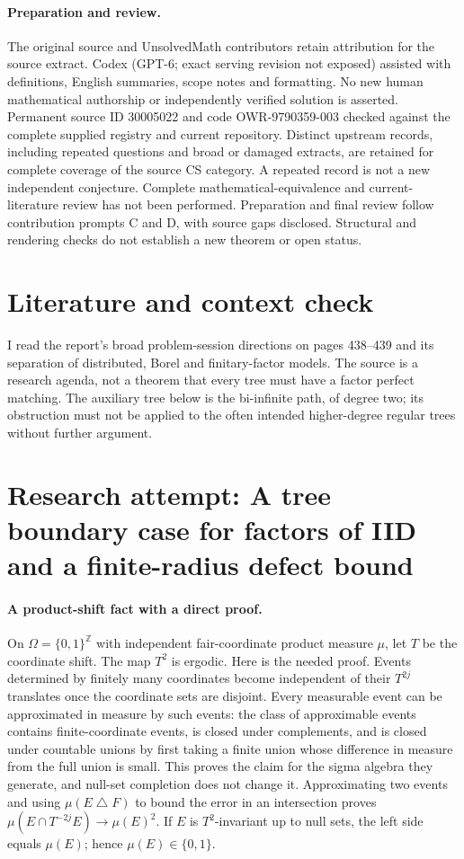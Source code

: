\documentclass[11pt]{article}
\begin{document}
\paragraph{Preparation and review.}
The original source and UnsolvedMath contributors retain attribution for the source extract. Codex (GPT-6; exact serving revision not exposed) assisted with definitions, English summaries, scope notes and formatting. No new human mathematical authorship or independently verified solution is asserted. Permanent source ID 30005022 and code OWR-9790359-003 checked against the complete supplied registry and current repository. Distinct upstream records, including repeated questions and broad or damaged extracts, are retained for complete coverage of the source CS category. A repeated record is not a new independent conjecture. Complete mathematical-equivalence and current-literature review has not been performed. Preparation and final review follow contribution prompts C and D, with source gaps disclosed. Structural and rendering checks do not establish a new theorem or open status.
\label{end:30005022}

\section{Literature and context check}

I read the report's broad problem-session directions on pages 438--439 and its
separation of distributed, Borel and finitary-factor models. The source is a
research agenda, not a theorem that every tree must have a factor perfect
matching. The auxiliary tree below is the bi-infinite path, of degree two;
its obstruction must not be applied to the often intended higher-degree
regular trees without further argument.

\section{Research attempt: A tree boundary case for factors of IID and a finite-radius defect bound}

\paragraph{A product-shift fact with a direct proof.}
On $\Omega=\{0,1\}^{\mathbb Z}$ with independent fair-coordinate product
measure $\mu$, let $T$ be the coordinate shift. The map $T^2$ is ergodic.
Here is the needed proof. Events determined by finitely many coordinates become
independent of their $T^{2j}$ translates once the coordinate sets are disjoint.
Every measurable event can be approximated in measure by such events: the
class of approximable events contains finite-coordinate events, is closed under
complements, and is closed under countable unions by first taking a finite union
whose difference in measure from the full union is small. This proves the
claim for the sigma algebra they generate, and null-set completion does not
change it. Approximating two events and using
$\mu(E\mathbin\triangle F)$ to bound the error in an intersection proves
$\mu(E\cap T^{-2j}E)\to\mu(E)^2$.
If $E$ is $T^2$-invariant up to null sets, the left side equals $\mu(E)$;
hence $\mu(E)\in\{0,1\}$.
\end{document}

